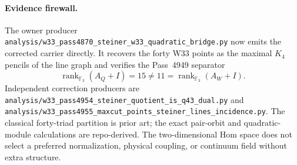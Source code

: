 \paragraph{Evidence firewall.}
The owner producer
\texttt{analysis/w33\_pass4870\_steiner\_w33\_quadratic\_bridge.py}
now emits the corrected carrier directly.  It recovers the forty W33 points as
the maximal $K_4$ pencils of the line graph and verifies the Pass~4949
separator
\[
  \operatorname{rank}_{\mathbb F_3}(A_Q+I)=15\ne11
  =\operatorname{rank}_{\mathbb F_3}(A_W+I).
\]
Independent correction producers are
\texttt{analysis/w33\_pass4954\_steiner\_quotient\_is\_q43\_dual.py} and
\texttt{analysis/w33\_pass4955\_maxcut\_points\_steiner\_lines\_incidence.py}.
The classical forty-triad partition is prior art; the exact pair-orbit and
quadratic-module calculations are repo-derived.  The two-dimensional Hom space
does not select a preferred normalization, physical coupling, or continuum
field without extra structure.
